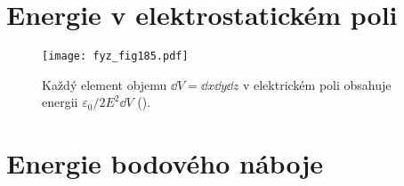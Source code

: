   \section{Energie v elektrostatickém poli}\label{fyz:IIchapVIsecV}

    \begin{figure}[ht!]  %
      \centering
      \texttt{[image: fyz\_fig185.pdf]}
      \caption{Každý element objemu \(\dd{V} = \dd{x}\dd{y}\dd{z}\) v elektrickém  poli obsahuje
      energii \(\varepsilon_0/2E^2\dd{V}\) (\cite[s.~154]{Feynman02}).}
      \label{fyz:fig185}
    \end{figure}
    
  \section{Energie bodového náboje}\label{fyz:IIchapVIsecVI}

